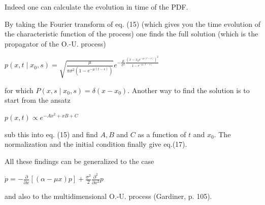 Indeed one can calculate the evolution in time of the PDF.

By taking the Fourier transform of eq. (15) (which gives you the time evolution
of the characteristic function of the process) one finds the full solution
(which is the propagator of the O.-U. process)
\begin{DispWithArrows}[displaystyle, format=c]
  $p\left(x, t \mid x_{0}, s\right)=\sqrt{\frac{\mu}{\pi \sigma^{2}\left(1-e^{-\mu(t-s)}\right)}} e^{-\frac{\mu}{\sigma^{2}} \frac{\left(x-x_{0} e^{-\mu(t-s)}\right)^{2}}{1-e^{-\mu(t-s)}}}$
\end{DispWithArrows}
for which $P\left(x, s \mid x_{0}, s\right)=\delta\left(x-x_{0}\right)$. Another
way to find the solution is to start from the ansatz
\begin{DispWithArrows}[displaystyle, format=c]
  $p(x, t) \propto e^{-A x^{2}+x B+C}$
\end{DispWithArrows}
sub this into eq. (15) and find $A, B$ and $C$ as a function of $t$ and $x_{0}$.
The normalization and the initial condition finally give eq.(17).

All these findings can be generalized to the case
\begin{DispWithArrows}[displaystyle, format=c]
  $\dot{p}=-\frac{\partial}{\partial x}[(\alpha-\mu x) p]+\frac{\sigma^{2}}{2} \frac{\partial^{2}}{\partial x^{2}} p$
\end{DispWithArrows}
and also to the multidimensional O.-U. process (Gardiner, p. 105).

